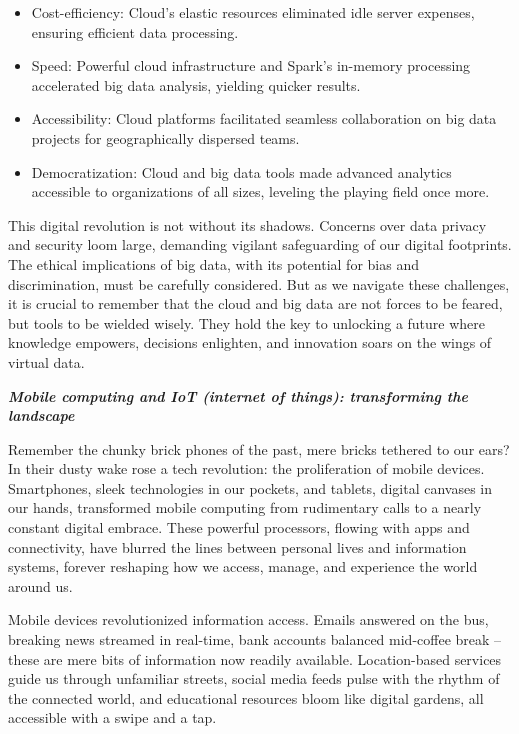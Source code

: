 \documentclass[
  letterpaper,
  DIV=11,
  numbers=noendperiod]{scrreprt}
\providecommand{\tightlist}{%
  \setlength{\itemsep}{0pt}\setlength{\parskip}{0pt}}\usepackage{longtable,booktabs,array}
\begin{document}
\begin{itemize}
\tightlist
\item
  Cost-efficiency: Cloud's elastic resources eliminated idle server
  expenses, ensuring efficient data processing.
\item
  Speed: Powerful cloud infrastructure and Spark's in-memory processing
  accelerated big data analysis, yielding quicker results.
\item
  Accessibility: Cloud platforms facilitated seamless collaboration on
  big data projects for geographically dispersed teams.
\item
  Democratization: Cloud and big data tools made advanced analytics
  accessible to organizations of all sizes, leveling the playing field
  once more.
\end{itemize}

This digital revolution is not without its shadows. Concerns over data
privacy and security loom large, demanding vigilant safeguarding of our
digital footprints. The ethical implications of big data, with its
potential for bias and discrimination, must be carefully considered. But
as we navigate these challenges, it is crucial to remember that the
cloud and big data are not forces to be feared, but tools to be wielded
wisely. They hold the key to unlocking a future where knowledge
empowers, decisions enlighten, and innovation soars on the wings of
virtual data.

\textbf{\emph{Mobile computing and IoT (internet of things):
transforming the landscape}}

Remember the chunky brick phones of the past, mere bricks tethered to
our ears? In their dusty wake rose a tech revolution: the proliferation
of mobile devices. Smartphones, sleek technologies in our pockets, and
tablets, digital canvases in our hands, transformed mobile computing
from rudimentary calls to a nearly constant digital embrace. These
powerful processors, flowing with apps and connectivity, have blurred
the lines between personal lives and information systems, forever
reshaping how we access, manage, and experience the world around us.

Mobile devices revolutionized information access. Emails answered on the
bus, breaking news streamed in real-time, bank accounts balanced
mid-coffee break -- these are mere bits of information now readily
available. Location-based services guide us through unfamiliar streets,
social media feeds pulse with the rhythm of the connected world, and
educational resources bloom like digital gardens, all accessible with a
swipe and a tap.
\end{document}
